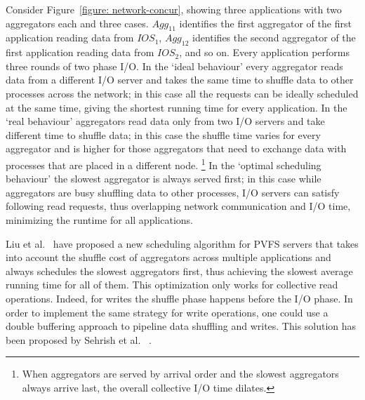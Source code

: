 Consider Figure~\ref{figure: network-concur}, showing three applications with two aggregators each and three cases. $Agg_{11}$ identifies the first aggregator of the first application reading data from
$IOS_1$, $Agg_{12}$ identifies the second aggregator of the first application reading data from $IOS_2$, and so on. Every application performs three rounds of two phase I/O. In the `ideal behaviour' every
aggregator reads data from a different I/O server and takes the same time to shuffle data to other processes across the network; in this case all the requests can be ideally scheduled at the same time, giving
the shortest running time for every application. In the `real behaviour' aggregators read data only from two I/O servers and take different time to shuffle data; in this case the shuffle time varies for every
aggregator and is higher for those aggregators that need to exchange data with processes that are placed in a different node. \footnote{When aggregators are served by arrival order and the slowest aggregators always
arrive last, the overall collective I/O time dilates.} In the `optimal scheduling behaviour' the slowest aggregator is always served first; in this case while aggregators are busy shuffling data to other
processes, I/O servers can satisfy following read requests, thus overlapping network communication and I/O time, minimizing the runtime for all applications.

Liu et al.~\cite{Liu2013} have proposed a new scheduling algorithm for PVFS servers that takes into account the shuffle cost of aggregators across multiple applications and always schedules the slowest
aggregators first, thus achieving the slowest average running time for all of them. This optimization only works for collective read operations. Indeed, for writes the shuffle phase happens before the 
I/O phase. In order to implement the same strategy for write operations, one could use a double buffering approach to pipeline data shuffling and writes. This solution has been proposed by Sehrish et al.
~\cite{Sehrish2013}.

